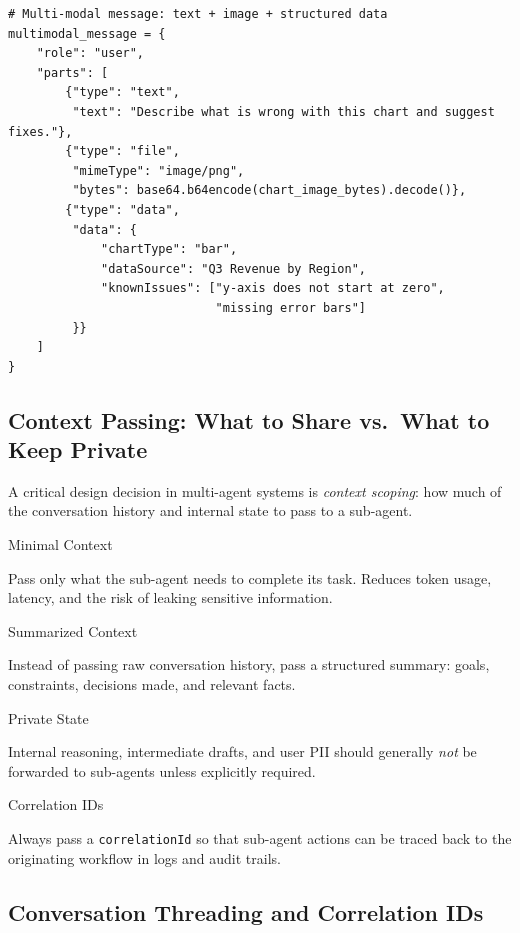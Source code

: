 \begin{examplebox}
\begin{lstlisting}[style=pythonstyle]
# Multi-modal message: text + image + structured data
multimodal_message = {
    "role": "user",
    "parts": [
        {"type": "text",
         "text": "Describe what is wrong with this chart and suggest fixes."},
        {"type": "file",
         "mimeType": "image/png",
         "bytes": base64.b64encode(chart_image_bytes).decode()},
        {"type": "data",
         "data": {
             "chartType": "bar",
             "dataSource": "Q3 Revenue by Region",
             "knownIssues": ["y-axis does not start at zero",
                             "missing error bars"]
         }}
    ]
}
\end{lstlisting}
\end{examplebox}

\subsection{Context Passing: What to Share vs.~What to Keep Private}
\label{context-passing-what-to-share-vs.-what-to-keep-private}

A critical design decision in multi-agent systems is \emph{context scoping}: how much of the conversation history and internal state to pass to a sub-agent.

\begin{keybox}
Minimal Context

Pass only what the sub-agent needs to complete its task. Reduces token usage, latency, and the risk of leaking sensitive information.

Summarized Context

Instead of passing raw conversation history, pass a structured summary: goals, constraints, decisions made, and relevant facts.

Private State

Internal reasoning, intermediate drafts, and user PII should generally \emph{not} be forwarded to sub-agents unless explicitly required.

Correlation IDs

Always pass a \texttt{correlationId} so that sub-agent actions can be traced back to the originating workflow in logs and audit trails.
\end{keybox}

\subsection{Conversation Threading and Correlation IDs}
\label{conversation-threading-and-correlation-ids}

